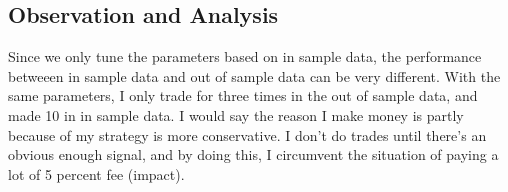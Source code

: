 \documentclass[a4paper]{article}
\begin{document}
\subsection{Observation and Analysis}
Since we only tune the parameters based on in sample data, the performance betweeen
in sample data and out of sample data can be very different. With the same parameters,
I only trade for three times in the out of sample data, and made 10 in in sample data.
I would say the reason I make money is partly because of my strategy is more conservative.
I don't do trades until there's an obvious enough signal, and by doing this,
I circumvent the situation of paying a lot of 5 percent fee (impact).
\end{document}
